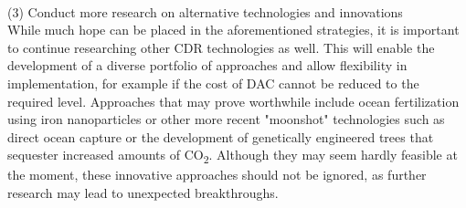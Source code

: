 \\(3) Conduct more research on alternative technologies and innovations\\
While much hope can be placed in the aforementioned strategies, it is important to continue researching other CDR technologies as well. This will enable the development of a diverse portfolio of approaches and allow flexibility in implementation, for example if the cost of DAC cannot be reduced to the required level. Approaches that may prove worthwhile include ocean fertilization using iron nanoparticles or other more recent "moonshot" technologies such as direct ocean capture or the development of genetically engineered trees that sequester increased amounts of CO\textsubscript{2}. Although they may seem hardly feasible at the moment, these innovative approaches should not be ignored, as further research may lead to unexpected breakthroughs.